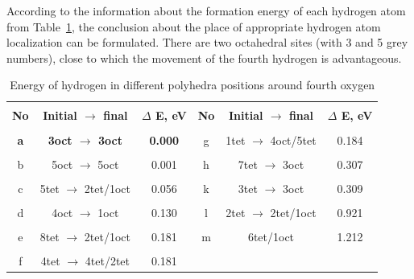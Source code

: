 According to the information about the formation energy of each hydrogen atom from Table~\ref{energy4}, the conclusion about the place of appropriate hydrogen atom localization can be formulated. There are two octahedral sites (with 3 and 5 grey numbers), close to which the movement of the fourth hydrogen is advantageous.  

\begin{table}[h]
\caption{Energy of hydrogen in different polyhedra positions around fourth oxygen}
\label{energy4}
\begin{center}
\begin{tabular}{|c|c|c|c|c|c|}
\hline
& & & & &\\
\textbf{No} & \textbf{Initial $\rightarrow$ final} & \textbf{$\Delta$ E, eV} & \textbf{No} & \textbf{Initial $\rightarrow$ final} & \textbf{$\Delta$ E, eV}\\ 
\hline
& & & & &\\
\textbf{a} & \textbf{3oct $\rightarrow$ 3oct} & \textbf{0.000} & g & 1tet $\rightarrow$ 4oct/5tet & 0.184 \\
\hline
& & & & &\\
b & 5oct $\rightarrow$ 5oct & 0.001 & h & 7tet $\rightarrow$ 3oct & 0.307 \\
\hline
& & & & &\\
c & 5tet $\rightarrow$ 2tet/1oct & 0.056 & k & 3tet $\rightarrow$ 3oct & 0.309 \\
\hline
& & & & &\\
d & 4oct $\rightarrow$ 1oct & 0.130 & l & 2tet $\rightarrow$ 2tet/1oct & 0.921 \\
\hline
& & & & &\\
e & 8tet $\rightarrow$ 2tet/1oct & 0.181 & m & 6tet/1oct & 1.212 \\
\hline
& & & & &\\
f & 4tet $\rightarrow$ 4tet/2tet & 0.181 & & &\\
\hline
\end{tabular}
\end{center}
\end{table}

